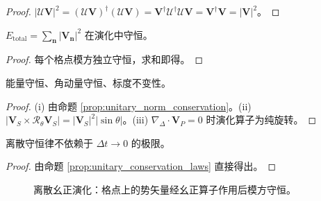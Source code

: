 \begin{proof}
$|\mathcal{U}\mathbf{V}|^2=(\mathcal{U}\mathbf{V})^\dagger(\mathcal{U}\mathbf{V})=\mathbf{V}^\dagger\mathcal{U}^\dagger\mathcal{U}\mathbf{V}=\mathbf{V}^\dagger\mathbf{V}=|\mathbf{V}|^2$。
\end{proof}

\begin{proposition}[幺正演化与格点总能量守恒]\label{prop:unitary_total_energy}
$E_{\text{total}}=\sum_{\mathbf{n}}|\mathbf{V}_{\mathbf{n}}|^2$ 在演化中守恒。
\end{proposition}

\begin{proof}
每个格点模方独立守恒，求和即得。
\end{proof}

\begin{proposition}[幺正性与三种守恒律的对应]\label{prop:unitary_conservation_laws}
能量守恒、角动量守恒、标度不变性。
\end{proposition}

\begin{proof}
(i) 由命题 \ref{prop:unitary_norm_conservation}。(ii) $|\mathbf{V}_S\times\mathcal{R}_\theta\mathbf{V}_S|=|\mathbf{V}_S|^2|\sin\theta|$。(iii) $\nabla_{\Delta}\cdot\mathbf{V}_P=0$ 时演化算子为纯旋转。
\end{proof}

\begin{corollary}\label{cor:unitary_noether}
离散守恒律不依赖于 $\Delta t\to 0$ 的极限。
\end{corollary}

\begin{proof}
由命题 \ref{prop:unitary_conservation_laws} 直接得出。
\end{proof}

\begin{figure}[htbp]
\centering
{}
\caption{离散幺正演化：格点上的势矢量经幺正算子作用后模方守恒。}
\label{fig:discrete_unitary}
\end{figure}

